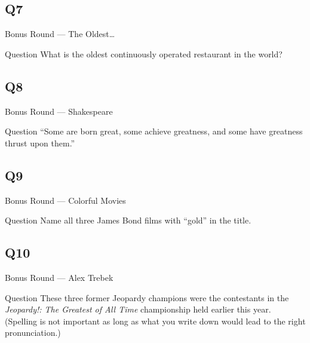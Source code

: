 \documentclass[11pt]{beamer}
\begin{document}
\subsection*{Q7}
\begin{frame}[t]{Bonus Round --- The Oldest\ldots}
\vspace{-0.5em}
\begin{block}{Question}
What is the oldest continuously operated restaurant in the world?
\end{block}
\end{frame}
\subsection*{Q8}
\begin{frame}[t]{Bonus Round --- Shakespeare}
\vspace{-0.5em}
\begin{block}{Question}
``Some are born great, some achieve greatness, and some have greatness thrust upon them.''
\end{block}
\end{frame}
\subsection*{Q9}
\begin{frame}[t]{Bonus Round --- Colorful Movies}
\vspace{-0.5em}
\begin{block}{Question}
Name all three James Bond films with ``gold'' in the title.
\end{block}
\end{frame}
\subsection*{Q10}
\begin{frame}[t]{Bonus Round --- Alex Trebek}
\vspace{-0.5em}
\begin{block}{Question}
These three former Jeopardy champions were the contestants in the \emph{Jeopardy!: The Greatest of All Time} championship held earlier this year. (Spelling is not important as long as what you write down would lead to the right pronunciation.)
\end{block}
\end{frame}
\end{document}
